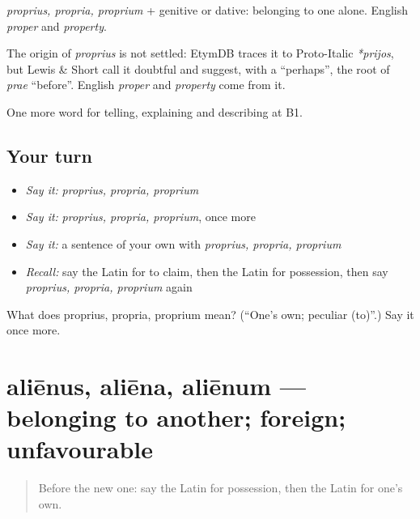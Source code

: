 \emph{proprius, propria, proprium} + genitive or dative: belonging to one alone. English \emph{proper} and \emph{property}.

\begin{cousinweb}
The origin of \emph{proprius} is not settled: EtymDB traces it to Proto-Italic \emph{*prijos}, but Lewis \& Short call it doubtful and suggest, with a \textquotedblleft{}perhaps\textquotedblright{}, the root of \emph{prae} \textquotedblleft{}before\textquotedblright{}. English \emph{proper} and \emph{property} come from it.
\end{cousinweb}

\begin{grammarlens}[title={What you've built}]
One more word for telling, explaining and describing at B1.
\end{grammarlens}

\subsection*{Your turn}
\begin{itemize}
\raggedright
  \item \emph{Say it:} \emph{proprius, propria, proprium}
  \item \emph{Say it:} \emph{proprius, propria, proprium}, once more
  \item \emph{Say it:} a sentence of your own with \emph{proprius, propria, proprium}
  \item \emph{Recall:} say the Latin for to claim, then the Latin for possession, then say \emph{proprius, propria, proprium} again
\end{itemize}

\begin{tcolorbox}[breakable,colback=teal!4,colframe=teal!35!black,title={Before you move on}]
What does proprius, propria, proprium mean? (\textquotedblleft{}One's own; peculiar (to)\textquotedblright{}.) Say it once more.
\end{tcolorbox}
\section[aliēnus, aliēna, aliēnum]{aliēnus, aliēna, aliēnum — belonging to another; foreign; unfavourable}

\label{lesson:LA-C417-alienus}



\begin{quote}
Before the new one: say the Latin for possession, then the Latin for one's own.
\end{quote}

